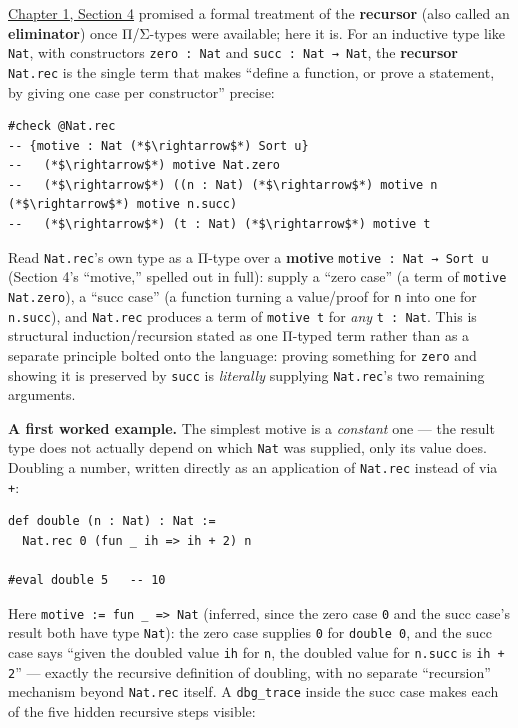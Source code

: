 \hyperref[sec:01-basics:04-terminology:1]{Chapter 1, Section 4} promised a formal treatment of the \textbf{recursor} (also called an \textbf{eliminator}) once Π/Σ-types were available; here it is. For an inductive type like \texttt{Nat}, with constructors \texttt{zero : Nat} and \texttt{succ : Nat → Nat}, the \textbf{recursor} \texttt{Nat.rec} is the single term that makes ``define a function, or prove a statement, by giving one case per constructor'' precise:

\begin{lstlisting}
#check @Nat.rec
-- {motive : Nat (*$\rightarrow$*) Sort u}
--   (*$\rightarrow$*) motive Nat.zero
--   (*$\rightarrow$*) ((n : Nat) (*$\rightarrow$*) motive n (*$\rightarrow$*) motive n.succ)
--   (*$\rightarrow$*) (t : Nat) (*$\rightarrow$*) motive t
\end{lstlisting}

Read \texttt{Nat.rec}'s own type as a Π-type over a \textbf{motive} \texttt{motive : Nat → Sort u} (Section 4's ``motive,'' spelled out in full): supply a ``zero case'' (a term of \texttt{motive Nat.zero}), a ``succ case'' (a function turning a value/proof for \texttt{n} into one for \texttt{n.succ}), and \texttt{Nat.rec} produces a term of \texttt{motive t} for \emph{any} \texttt{t : Nat}. This is structural induction/recursion stated as one Π-typed term rather than as a separate principle bolted onto the language: proving something for \texttt{zero} and showing it is preserved by \texttt{succ} is \emph{literally} supplying \texttt{Nat.rec}'s two remaining arguments.

\textbf{A first worked example.} The simplest motive is a \emph{constant} one --- the result type does not actually depend on which \texttt{Nat} was supplied, only its value does. Doubling a number, written directly as an application of \texttt{Nat.rec} instead of via \texttt{+}:

\begin{lstlisting}
def double (n : Nat) : Nat :=
  Nat.rec 0 (fun _ ih => ih + 2) n

#eval double 5   -- 10
\end{lstlisting}

Here \texttt{motive := fun \_\allowbreak{} => Nat} (inferred, since the zero case \texttt{0} and the succ case's result both have type \texttt{Nat}): the zero case supplies \texttt{0} for \texttt{double 0}, and the succ case says ``given the doubled value \texttt{ih} for \texttt{n}, the doubled value for \texttt{n.succ} is \texttt{ih + 2}'' --- exactly the recursive definition of doubling, with no separate ``recursion'' mechanism beyond \texttt{Nat.rec} itself. A \texttt{dbg\_\allowbreak{}trace} inside the succ case makes each of the five hidden recursive steps visible:

